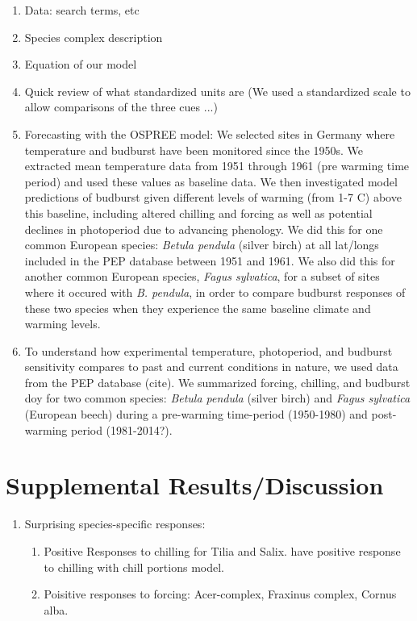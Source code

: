 \documentclass{article}
\begin{document}
\begin{enumerate}
\item Data: search terms, etc
\item Species complex description
\item Equation of our model

\item Quick review of what standardized units are (We used a standardized scale to allow comparisons of the three cues ...)

\item Forecasting with the OSPREE model: We selected sites in Germany where temperature and budburst have been monitored since the 1950s. We extracted mean temperature data from 1951 through 1961 (pre warming time period) and used these values as baseline data. We then investigated model predictions of budburst given different levels of warming (from 1-7 \degree C) above this baseline, including altered chilling and forcing as well as potential declines in photoperiod due to advancing phenology. We did this for one common European species: \emph{Betula pendula} (silver birch) at all lat/longs included in the PEP database between 1951 and 1961. We also did this for another common European species, \emph{Fagus sylvatica}, for a subset of sites where it occured with \emph{B. pendula}, in order to compare budburst responses of these two species when they experience the same baseline climate and warming levels.

\item  To understand how experimental temperature, photoperiod, and budburst sensitivity compares to past and current conditions in nature, we used data from the PEP database (cite). We summarized forcing, chilling, and budburst doy for two common species: \emph{Betula pendula} (silver birch) and \emph{Fagus sylvatica} (European beech) during a pre-warming time-period (1950-1980) and post-warming period (1981-2014?). 

\end{enumerate}
\section*{Supplemental Results/Discussion}
\begin{enumerate}
\item Surprising species-specific responses: 
\begin{enumerate}
\item Positive Responses to chilling for Tilia and Salix.  have positive response to chilling with chill portions model.

\item Poisitive responses to forcing: Acer-complex, Fraxinus complex, Cornus alba.
\end{enumerate}
\end{enumerate}
\end{document}
